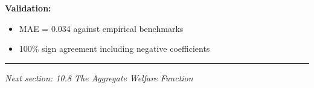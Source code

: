 \begin{tcolorbox}[colback=gray!5!white, colframe=gray!75!black, title=Section 10.7 Summary]
\textbf{Validation:}
\begin{itemize}
\item MAE = 0.034 against empirical benchmarks
\item 100\% sign agreement including negative coefficients
\end{itemize}
\end{tcolorbox}

\vspace{1em}
\hrule
\vspace{0.5em}
\noindent\textit{Next section: 10.8 The Aggregate Welfare Function}

